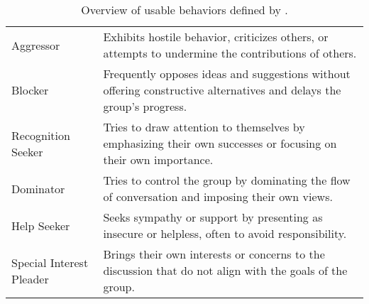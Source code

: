 \begin{table*}[htbp]
\begin{tabularx}{\textwidth}{>{\raggedright\arraybackslash}p{}X}
    \midrule
    \rowcolor{gray!20} 
    \multicolumn{2}{c}{\textbf{Individual behavior}} \\
    \midrule
    
    Aggressor & Exhibits hostile behavior, criticizes others, or attempts to undermine the contributions of others. \\
    Blocker & Frequently opposes ideas and suggestions without offering constructive alternatives and delays the group's progress. \\
    Recognition Seeker & Tries to draw attention to themselves by emphasizing their own successes or focusing on their own importance. \\
    Dominator & Tries to control the group by dominating the flow of conversation and imposing their own views. \\
    Help Seeker & Seeks sympathy or support by presenting as insecure or helpless, often to avoid responsibility. \\
    Special Interest Pleader & Brings their own interests or concerns to the discussion that do not align with the goals of the group. \\
    \bottomrule
  \end{tabularx}
  \caption{Overview of usable behaviors defined by \citet{BenneS48}.}
  \label{tab:app_role_overview}
\end{table*}

